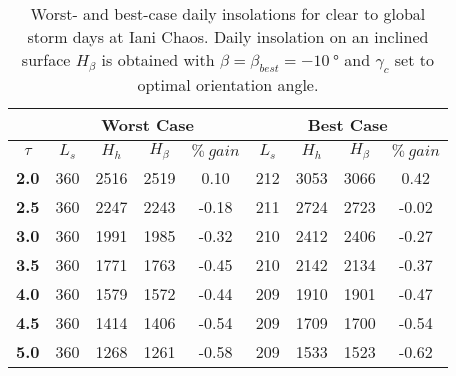 \begin{table}[h]
\footnotesize
\centering
\caption[Worst- and best-case daily insolations for global storm days at Iani Chaos]
{Worst- and best-case daily insolations for clear to global storm days at Iani Chaos. Daily insolation on an inclined surface $H_{\beta}$ is obtained with $\beta = \beta_{best} = \SI{-10}{\degree}$ and $\gamma_{c}$ set to optimal orientation angle.}
\label{tab:insolation-iani-chaos-global-storm-days}
\begin{tabular}{c|c|c|c|c|c|c|c|c|}
\cline{2-9}
\multicolumn{1}{l|}{} & \multicolumn{4}{c|}{\textbf{Worst Case}} & \multicolumn{4}{c|}{\textbf{Best Case}} \\ \hline
\multicolumn{1}{|c|}{$\tau$} & $L_{s}$ & $H_{h}$ & $H_{\beta}$ & $\%\:gain$ & $L_{s}$ & $H_{h}$ & $H_{\beta}$ & $\%\:gain$ \\ \hline
\multicolumn{1}{|c|}{\textbf{2.0}} & 360 & 2516 & 2519 & 0.10 & 212 & 3053 & 3066 & 0.42 \\ \hline
\multicolumn{1}{|c|}{\textbf{2.5}} & 360 & 2247 & 2243 & -0.18 & 211 & 2724 & 2723 & -0.02 \\ \hline
\multicolumn{1}{|c|}{\textbf{3.0}} & 360 & 1991 & 1985 & -0.32 & 210 & 2412 & 2406 & -0.27 \\ \hline
\multicolumn{1}{|c|}{\textbf{3.5}} & 360 & 1771 & 1763 & -0.45 & 210 & 2142 & 2134 & -0.37 \\ \hline
\multicolumn{1}{|c|}{\textbf{4.0}} & 360 & 1579 & 1572 & -0.44 & 209 & 1910 & 1901 & -0.47 \\ \hline
\multicolumn{1}{|c|}{\textbf{4.5}} & 360 & 1414 & 1406 & -0.54 & 209 & 1709 & 1700 & -0.54 \\ \hline
\multicolumn{1}{|c|}{\textbf{5.0}} & 360 & 1268 & 1261 & -0.58 & 209 & 1533 & 1523 & -0.62 \\ \hline
\end{tabular}
\end{table}
